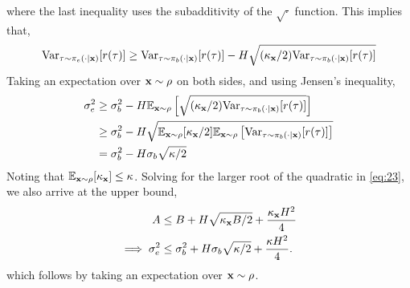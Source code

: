 where the last inequality uses the subadditivity of the $\sqrt{\cdot}$ function. This implies that,
\begin{align*}
    \mathrm{Var}_{\tau \sim \pi_e (\cdot\mid\mathbf{x})} [r(\tau)] \ge \mathrm{Var}_{\tau \sim \pi_b (\cdot\mid\mathbf{x})} [r(\tau)] - H \sqrt{ (\kappa_{\mathbf{x}}/2) \mathrm{Var}_{\tau \sim \pi_b (\cdot\mid\mathbf{x})} [r(\tau)] }
\end{align*}
Taking an expectation over $\mathbf{x} \sim \rho$ on both sides,
and using Jensen's inequality,
\begin{align*}
    \sigma^2_e &\ge \sigma^2_b - H \mathbb{E}_{\mathbf{x} \sim \rho} \left[ \sqrt{ (\kappa_{\mathbf{x}}/2) \mathrm{Var}_{\tau \sim \pi_b (\cdot\mid\mathbf{x})} [r(\tau)] } \right] \\
    &\ge \sigma^2_b - H \sqrt{ \mathbb{E}_{\mathbf{x} \sim \rho} [\kappa_{\mathbf{x}}/2] \mathbb{E}_{\mathbf{x} \sim \rho} \left[ \mathrm{Var}_{\tau \sim \pi_b (\cdot\mid\mathbf{x})} [r(\tau)] \right]} \\
    &= \sigma^2_b - H \sigma_b \sqrt{\kappa/2}
\end{align*}
Noting that $\mathbb{E}_{\mathbf{x} \sim \rho} [\kappa_{\mathbf{x}}] \le \kappa$. Solving for the larger root of the quadratic in \cref{eq:23}, we also arrive at the upper bound,
\begin{align}
    A &\le B + H \sqrt{\kappa_{\mathbf{x}} B /2} + \frac{\kappa_{\mathbf{x}} H^2}{4} \nonumber\\
    \implies \sigma_e^2 &\le \sigma_b^2 + H \sigma_b \sqrt{\kappa/2}+ \frac{\kappa H^2}{4}. \label{eq:var-ub}
\end{align}
which follows by taking an expectation over $\mathbf{x} \sim \rho$.

